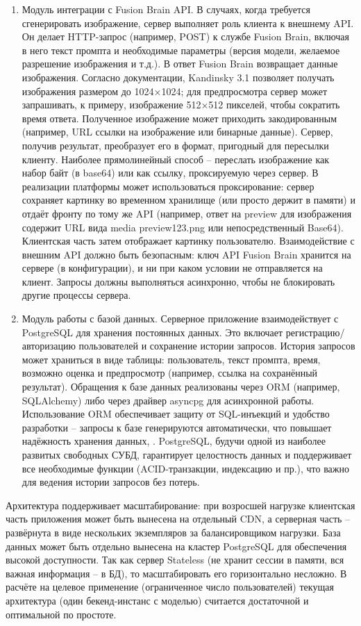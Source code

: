 \begin{enumerate}[label=\arabic*]
    \item Модуль интеграции с Fusion Brain API. В случаях, когда требуется сгенерировать изображение, сервер выполняет роль клиента к внешнему API. Он делает HTTP-запрос (например, POST) к службе Fusion Brain, включая в него текст промпта и необходимые параметры (версия модели, желаемое разрешение изображения и т.д.). В ответ Fusion Brain возвращает данные изображения. Согласно документации, Kandinsky 3.1 позволяет получать изображения размером до 1024×1024; для предпросмотра сервер может запрашивать, к примеру, изображение 512×512 пикселей, чтобы сократить время ответа\cite{fusionbrain:docs}. Полученное изображение может приходить закодированным (например, URL ссылки на изображение или бинарные данные). Сервер, получив результат, преобразует его в формат, пригодный для пересылки клиенту. Наиболее прямолинейный способ – переслать изображение как набор байт (в base64) или как ссылку, проксируемую через сервер. В реализации платформы может использоваться проксирование: сервер сохраняет картинку во временном хранилище (или просто держит в памяти) и отдаёт фронту по тому же API (например, ответ на preview для изображения содержит URL вида media preview123.png или непосредственный Base64). Клиентская часть затем отображает картинку пользователю. Взаимодействие с внешним API должно быть безопасным: ключ API Fusion Brain хранится на сервере (в конфигурации), и ни при каком условии не отправляется на клиент. Запросы должны выполняться асинхронно, чтобы не блокировать другие процессы сервера.
    \item Модуль работы с базой данных. Серверное приложение взаимодействует с PostgreSQL для хранения постоянных данных. Это включает регистрацию/авторизацию пользователей и сохранение истории запросов. История запросов может храниться в виде таблицы: пользователь, текст промпта, время, возможно оценка и предпросмотр (например, ссылка на сохранённый результат). Обращения к базе данных реализованы через ORM (например, SQLAlchemy) либо через драйвер asyncpg для асинхронной работы. Использование ORM обеспечивает защиту от SQL-инъекций и удобство разработки – запросы к базе генерируются автоматически, что повышает надёжность хранения данных\cite{postgresql:skillfactory}, \cite{postgresql:wiki}. PostgreSQL, будучи одной из наиболее развитых свободных СУБД, гарантирует целостность данных и поддерживает все необходимые функции (ACID-транзакции, индексацию и пр.), что важно для ведения истории запросов без потерь. 
\end{enumerate}
Архитектура поддерживает масштабирование: при возросшей нагрузке клиентская часть приложения может быть вынесена на отдельный CDN, а серверная часть – развёрнута в виде нескольких экземпляров за балансировщиком нагрузки. База данных может быть отдельно вынесена на кластер PostgreSQL для обеспечения высокой доступности. Так как сервер Stateless (не хранит сессии в памяти, вся важная информация – в БД), то масштабировать его горизонтально несложно. В расчёте на целевое применение (ограниченное число пользователей) текущая архитектура (один бекенд-инстанс с моделью) считается достаточной и оптимальной по простоте.

